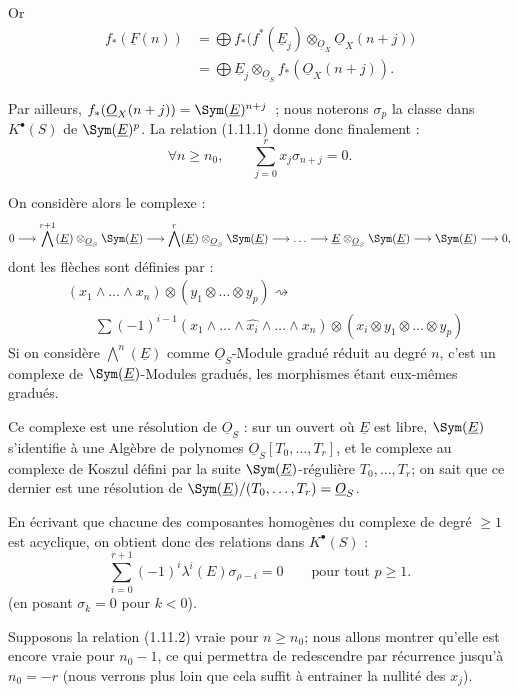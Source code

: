 
Or
\[
\begin{aligned}
  f_*(\underline{F}(n))
  &=\bigoplus f_*\bigl(f^*(\underline{E}_j)\otimes_{\underline{O}_X}\underline{O}_X(n+j)\bigr)\\
  &=\bigoplus \underline{E}_j\otimes_{\underline{O}_S} f_*(\underline{O}_X(n+j)).
\end{aligned}
\]

Par
ailleurs, \(f_*(\underline{O}_X(n+j))=\Sym(\underline{E})^{n+j}\)~; nous noterons \(\sigma_p\) la classe dans \(K^{\bullet}(S)\) de \(\Sym(\underline{E})^p\). La relation (1.11.1) donne donc finalement :
\begin{equation}\tag{1.11.2}
  \forall n\geq n_0,
  \qquad
  \sum_{j=0}^r x_j\sigma_{n+j}=0.
\end{equation}

On considère alors le complexe :
\[
  0\longrightarrow \bigwedge^{r+1}(\underline{E})\otimes_{\underline{O}_S}\Sym(\underline{E})
  \longrightarrow \bigwedge^r(\underline{E})\otimes_{\underline{O}_S}\Sym(\underline{E})
  \longrightarrow\ldots\longrightarrow
  \underline{E}\otimes_{\underline{O}_S}\Sym(\underline{E})
  \longrightarrow \Sym(\underline{E})\longrightarrow0,
\]
dont les flèches sont définies par :
\[
\begin{aligned}
&(x_1\wedge\ldots\wedge x_n)\otimes(y_1\otimes\ldots\otimes y_p)\rightsquigarrow{}\\
&\qquad \sum(-1)^{i-1}(x_1\wedge\ldots\wedge\widehat{x_i}\wedge\ldots\wedge x_n)
\otimes(x_i\otimes y_1\otimes\ldots\otimes y_p)
\end{aligned}
\]
Si on considère \(\bigwedge^n(\underline{E})\) comme \(\underline{O}_S\)-Module gradué réduit au degré \(n\), c'est un complexe de \(\Sym(\underline{E})\)-Modules gradués, les morphismes étant eux-mêmes gradués.

Ce complexe est une résolution de \(\underline{O}_S\) : sur un ouvert où \(\underline{E}\) est libre, \(\Sym(\underline{E})\) s'identifie à une Algèbre de polynomes \(\underline{O}_S[T_0,\ldots,T_r]\), et le complexe au complexe de Koszul défini par la suite \(\Sym(\underline{E})\)-régulière \(T_0,\ldots,T_r\); on sait que ce dernier est une résolution de \(\Sym(\underline{E})/(T_0,\ldots,T_r)=\underline{O}_S\).

En écrivant que chacune des composantes homogènes du complexe de degré \(\geq1\) est acyclique, on obtient donc des relations dans \(K^{\bullet}(S)\) :
\begin{equation}\tag{1.11.3}
  \sum_{i=0}^{r+1}(-1)^i\lambda^i(E)\sigma_{\rho-i}=0
  \qquad\text{pour tout }p\geq1.
\end{equation}
(en posant \(\sigma_k=0\) pour \(k<0\)).

Supposons la relation (1.11.2) vraie pour \(n\geq n_0\); nous allons montrer qu'elle est encore vraie pour \(n_0-1\), ce qui permettra de redescendre par récurrence jusqu'à \(n_0=-r\) (nous verrons plus loin que cela suffit à entrainer la nullité des \(x_j\)).

